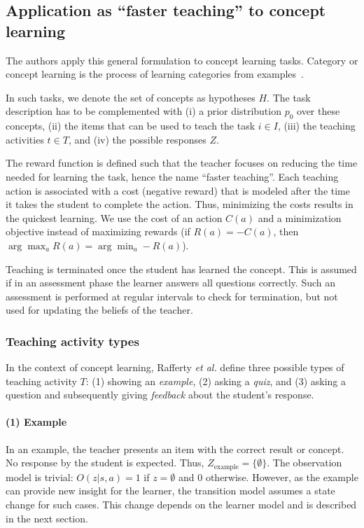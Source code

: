 \subsection{Application as ``faster teaching'' to concept learning}
\label{sec:concept-learning}

The authors apply this general formulation to concept learning tasks.
Category or concept learning is the process of learning categories from examples~\cite{feldman2003simplicity}.

In such tasks, we denote the set of concepts as hypotheses $H$.%
The task description has to be complemented with (i) a prior distribution $p_0$ over these concepts, (ii) the items that can be used to teach the task $i \in I$, (iii) the teaching activities $t \in T$, and (iv) the possible responses $Z$.

The reward function is defined such that the teacher focuses on reducing the time needed for learning the task, hence the name ``faster teaching''. 
Each teaching action is associated with a cost (negative reward) that is modeled after the time it takes the student to complete the action. 
Thus, minimizing the costs results in the quickest learning. 
We use the cost of an action $C(a)$ and a minimization objective instead of maximizing rewards (if $R(a) = -C(a)$, then $\arg \max_a R(a) = \arg \min_a -R(a)$).

Teaching is terminated once the student has learned the concept. This is assumed if in an assessment phase the learner answers all questions correctly.
Such an assessment is performed at regular intervals to check for termination, but not used for updating the beliefs of the teacher.

\subsubsection{Teaching activity types}

In the context of concept learning, Rafferty \textit{et al.} define three possible types of teaching activity $T$: (1) showing an \textit{example}, (2) asking a \textit{quiz}, and (3) asking a question and subsequently giving \textit{feedback} about the student's response. 

\paragraph{(1) Example} In an example, the teacher presents an item with the correct result or concept. No response by the student is expected. Thus, $Z_{\text{example}} = \{\emptyset\}$. The observation model is trivial: $O(z|s,a)=1$ if $z=\emptyset$ and $0$ otherwise. However, as the example can provide new insight for the learner, the transition model assumes a state change for such cases. This change depends on the learner model and is described in the next section.

